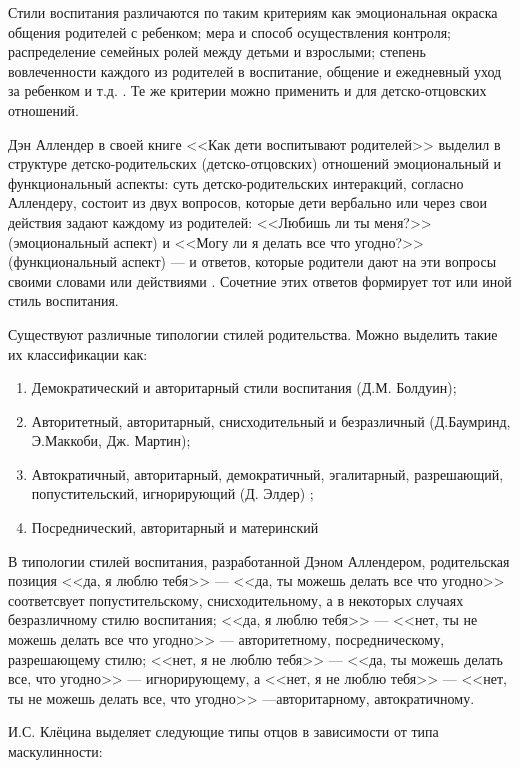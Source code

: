 \documentclass{../../common/thesisbyxetex}
\begin{document}
Стили воспитания различаются по таким критериям как эмоциональная окраска общения родителей с
ребенком; мера и способ осуществления контроля; распределение семейных ролей между детьми и
взрослыми; степень вовлеченности каждого из родителей в воспитание, общение и ежедневный уход за
ребенком и т.д. \cite{stil}. Те же критерии можно применить и для детско-отцовских отношений.

Дэн Аллендер в своей книге <<Как дети воспитывают родителей>> выделил в структуре
детско-родительских (детско-отцовских) отношений эмоциональный и функциональный аспекты: суть
детско-родительских
интеракций, согласно Аллендеру, состоит из двух вопросов, которые дети вербально или
через свои действия задают каждому из родителей: <<Любишь ли ты меня?>> (эмоциональный аспект) и
<<Могу ли я делать все что угодно?>> (функциональный аспект) --- и ответов, которые родители
дают на эти вопросы своими словами или действиями \cite{den}. Сочетние этих ответов формирует тот
или иной стиль воспитания.

Существуют различные типологии стилей родительства. Можно выделить такие их классификации как:

\begin{enumerate}
	\item Демократический и авторитарный стили воспитания (Д.М. Болдуин);
	\item Авторитетный, авторитарный, снисходительный и безразличный (Д.Баумринд, Э.Маккоби, Дж.
Мартин);
	\item Автократичный, авторитарный, демократичный, эгалитарный, разрешающий, попустительский,
игнорирующий (Д. Элдер) \cite{stil};
	\item Посреднический,
	авторитарный  и материнский
\cite[281]{strat}
\end{enumerate}

В типологии стилей воспитания, разработанной Дэном Аллендером, родительская позиция <<да, я
люблю тебя>> --- <<да, ты можешь делать
все что угодно>> соответсвует попустительскому, снисходительному, а в некоторых случаях
безразличному стилю воспитания; <<да, я люблю тебя>>  --- <<нет, ты не можешь делать все что
угодно>> --- авторитетному, посредническому, разрешающему стилю; <<нет, я не люблю тебя>> --- <<да,
ты можешь делать все, что угодно>>  --- игнорирующему, а  <<нет, я не люблю тебя>> --- <<нет, ты не
можешь делать все, что угодно>> ---авторитарному, автократичному.


И.С. Клёцина выделяет следующие типы отцов в зависимости от типа маскулинности:
\end{document}
